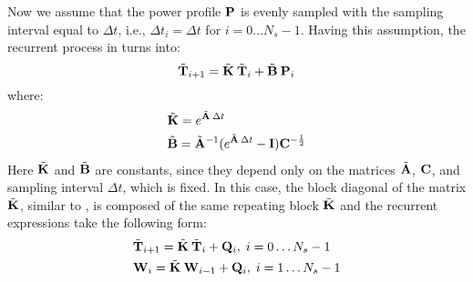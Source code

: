 Now we assume that the power profile $\mathbb{\mathbf{P}}$ is evenly sampled with the sampling interval equal to $\Delta t$, i.e., $\Delta t_i = \Delta t$ for $i = 0 \dots N_s - 1$. Having this assumption, the recurrent process in  turns into:
\[
  \tilde{\mathbf{T}}_{i+1} = \tilde{\mathbf{K}} \: \tilde{\mathbf{T}}_i + \tilde{\mathbf{B}} \: \mathbf{P}_i
\]
where:
\begin{align*}
  & \tilde{\mathbf{K}} = e^{\tilde{\mathbf{A}} \: \Delta t} \\
  & \tilde{\mathbf{B}} = \tilde{\mathbf{A}}^{-1} ( e^{\tilde{\mathbf{A}} \: \Delta t} - \mathbf{I} ) \mathbf{C}^{-\frac{1}{2}}
\end{align*}
Here $\tilde{\mathbf{K}}$ and $\tilde{\mathbf{B}}$ are constants, since they depend only on the matrices $\tilde{\mathbf{A}}$, $\mathbf{C}$, and sampling interval $\Delta t$, which is fixed. In this case, the block diagonal of the matrix $\tilde{\mathbb{\mathbf{K}}}$, similar to , is composed of the same repeating block $\tilde{\mathbf{K}}$ and the recurrent expressions take the following form:
\begin{align}
  & \tilde{\mathbf{T}}_{i + 1} = \tilde{\mathbf{K}} \: \tilde{\mathbf{T}}_i + \mathbf{Q}_i, \; i = 0 \dots N_s - 1 \nonumber \\
  & \mathbf{W}_i = \tilde{\mathbf{K}} \: \mathbf{W}_{i - 1} + \mathbf{Q}_i, \; i = 1 \dots N_s - 1 \nonumber
\end{align}
